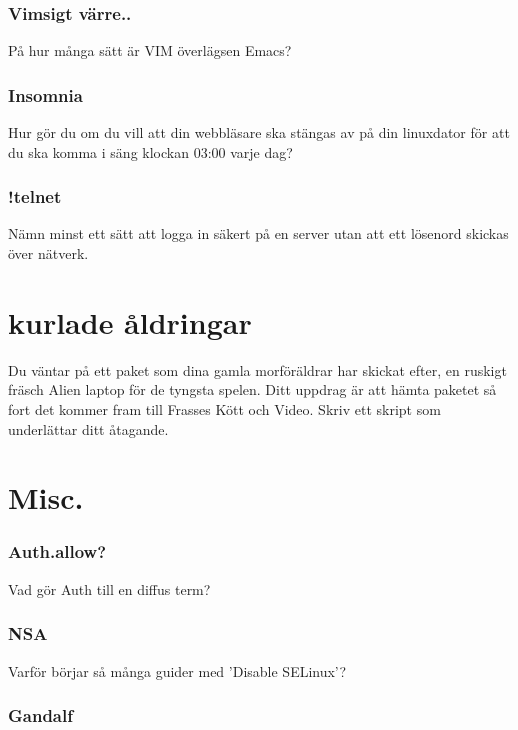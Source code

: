 \subsubsection{Vimsigt värre..}\label{vimsigt-vuxe4rre..}

På hur många sätt är VIM överlägsen Emacs?

\subsubsection{Insomnia}\label{insomnia}

Hur gör du om du vill att din webbläsare ska stängas av på din
linuxdator för att du ska komma i säng klockan 03:00 varje dag?

\subsubsection{!telnet}\label{telnet}

Nämn minst ett sätt att logga in säkert på en server utan att ett
lösenord skickas över nätverk.

\section{kurlade åldringar}\label{kurlade-uxe5ldringar}

Du väntar på ett paket som dina gamla morföräldrar har skickat efter, en
ruskigt fräsch Alien laptop för de tyngsta spelen. Ditt uppdrag är att
hämta paketet så fort det kommer fram till Frasses Kött och Video. Skriv
ett skript som underlättar ditt åtagande.

\section{Misc.}\label{misc.}

\subsubsection{Auth.allow?}\label{auth.allow}

Vad gör Auth till en diffus term?

\subsubsection{NSA}\label{nsa}

Varför börjar så många guider med 'Disable SELinux'?

\subsubsection{Gandalf}\label{gandalf}

